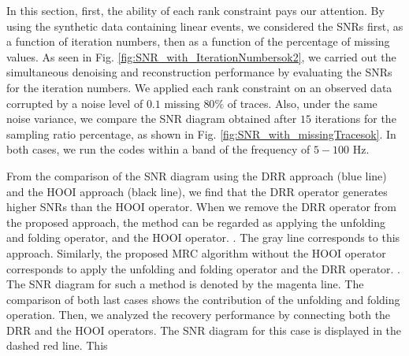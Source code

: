 In this section, first, the ability of each rank constraint pays our attention. By using the synthetic data containing linear events, we considered the SNRs first, as a function of iteration numbers, then as a function of the percentage of missing values. As seen in Fig. \ref{fig:SNR_with_IterationNumbersok2}, we carried out the simultaneous denoising and reconstruction performance by evaluating the SNRs for the iteration numbers. We applied each rank constraint on an observed data corrupted by a noise level of $0.1$ missing $80\%$ of traces. Also, under the same noise variance, we compare the SNR diagram obtained after $15$ iterations for the sampling ratio percentage, as shown in Fig. \ref{fig:SNR_with_missingTracesok}. In both cases, we run the codes within a band of the frequency of $5-100$ Hz. 

 From the comparison of the SNR diagram using the DRR approach (blue line) and the HOOI approach (black line), we find that the DRR operator generates higher SNRs than the HOOI operator. When we remove the DRR operator from the proposed  approach, the method can be regarded as applying the unfolding and folding operator, and the HOOI operator. . The gray line corresponds to this approach. Similarly, the proposed MRC algorithm without the HOOI operator corresponds to apply the unfolding and folding operator and the DRR operator. . The SNR diagram for such a method is denoted by the magenta line. The comparison of both last cases shows the contribution of the unfolding and folding operation. Then, we analyzed the recovery performance by connecting both the DRR and the HOOI operators.  The SNR diagram for this case is displayed in the dashed red line. This 